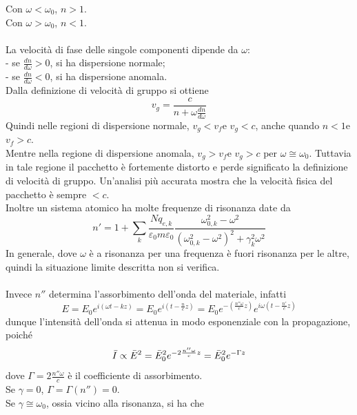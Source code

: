 \documentclass{article}
\begin{document}
Con $\omega<\omega_0$, $n>1$.\\
Con $\omega>\omega_0$, $n<1$.\\
\\
La velocità di fase delle singole componenti dipende da $\omega$:\\
- se $\frac{dn}{d\omega}>0$, si ha dispersione normale;\\
- se $\frac{dn}{d\omega}<0$, si ha dispersione anomala.\\
Dalla definizione di velocità di gruppo si ottiene
\begin{equation}
    v_g=\frac{c}{n+\omega\frac{dn}{d\omega}}
    \nonumber
\end{equation}
Quindi nelle regioni di dispersione normale, $v_g<v_f$e $v_g<c$, anche quando $n<1$e $v_f>c$.\\
Mentre nella regione di dispersione anomala, $v_g>v_f$e $v_g>c$ per $\omega\cong\omega_0$. Tuttavia in tale regione il pacchetto è fortemente distorto e perde significato la definizione di velocità di gruppo. Un’analisi più accurata mostra che la velocità fisica del pacchetto è sempre $<c$.\\
Inoltre un sistema atomico ha molte frequenze di risonanza date da
\begin{equation}
    n'=1+\sum_k\frac{Nq_{e,k}}{\varepsilon_0m\varepsilon_0}\frac{\omega_{0,k}^2-\omega^2}{(\omega_{0,k}^2-\omega^2)^2+\gamma_k^2\omega^2}
    \nonumber
\end{equation}
In generale, dove $\omega$ è a risonanza per una frequenza è fuori
risonanza per le altre, quindi la situazione limite descritta non si verifica.\\
\\
Invece $n''$ determina l'assorbimento dell'onda del materiale, infatti
\begin{equation}
    E=E_0e^{i(\omega t-kz)}=E_0e^{i\left(t-\frac{n}{c}z\right)}=E_0e^{-\left(\frac{n''\omega}{c}z\right)}e^{i\omega\left(t-\frac{n'}{c}z\right)}
    \nonumber
\end{equation}
dunque l’intensità dell’onda si attenua in modo esponenziale con la propagazione, poiché
\begin{equation}
    \Bar{I}\propto\Bar{E}^2=\Bar{E}_0^2e^{-2\frac{n''\omega}{c}z}=\Bar{E}_0^2e^{-\Gamma z}
    \nonumber
\end{equation}
dove $\Gamma=2\frac{n''\omega}{c}$ è il coefficiente di assorbimento.\\
Se $\gamma=0$, $\Gamma=\Gamma(n'')=0$.\\
Se $\gamma\cong\omega_0$, ossia vicino alla risonanza, si ha che
\end{document}
